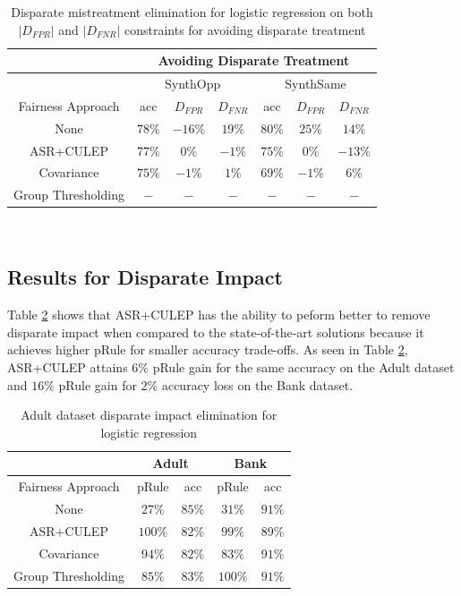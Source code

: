 \documentclass[runningheads]{llncs}
\begin{document}
\begin{table}[!htbp]
      \centering
\begin{tabular}{|c|c|c|c|c|c|c|}
\hline
{} & \multicolumn{6}{c}{Avoiding Disparate Treatment} \vline \\
\hline
{} & \multicolumn{3}{c|}{SynthOpp} & \multicolumn{3}{c|}{SynthSame} \vline \\
\hline
Fairness Approach & acc & $D_{FPR}$ & $D_{FNR}$ & acc & $D_{FPR}$ & $D_{FNR}$ \\
\hline
None & $78\%$ & $-16\%$  & $19\%$  & $80\%$  & $25\%$  & $14\%$ \\
\hline
ASR+CULEP & $77\%$ & $0\%$  & $-1\%$  & $75\%$  & $0\%$  & $-13\%$ \\
\hline
Covariance & $75\%$ & $-1\%$  & $1\%$  & $69\%$  & $-1\%$  & $6\%$ \\
\hline
Group Thresholding & $-$ & $-$  & $-$  & $-$  & $-$  & $-$ \\
\hline 
\end{tabular}
\\
\caption{Disparate mistreatment elimination for logistic regression on both $|D_{FPR}|$ and $|D_{FNR}|$ constraints for avoiding disparate treatment}
\label{tab:avoiddisptreatmenttable}
\end{table}

\subsection{Results for Disparate Impact}
Table \ref{tab:dispimpact} shows that ASR+CULEP has the ability to peform better to remove disparate impact when compared to the state-of-the-art solutions because it achieves higher pRule for smaller accuracy trade-offs. As seen in Table \ref{tab:dispimpact}, ASR+CULEP attains $6\%$ pRule gain for the same accuracy on the Adult dataset and $16\%$ pRule gain for $2\%$ accuracy loss on the Bank dataset.
\begin{table}[!htbp]
      \centering
\begin{tabular}{|c|c|c|c|c|}
\hline
{} & \multicolumn{2}{c|}{Adult} & \multicolumn{2}{c|}{Bank} \vline \\
\hline
Fairness Approach & pRule & acc & pRule & acc\\
\hline
None & $27\%$ & $85\%$  & $31\%$  & $91\%$  \\
\hline
ASR+CULEP & $100\%$ & $82\%$  & $99\%$  & $89\%$  \\
\hline
Covariance & $94\%$ & $82\%$  & $83\%$  & $91\%$  \\
\hline
Group Thresholding & $85\%$ & $83\%$  & $100\%$  & $91\%$ \\
\hline 
\end{tabular}
\\
\caption{Adult dataset disparate impact elimination for logistic regression}
\label{tab:dispimpact}
\end{table}
\end{document}
